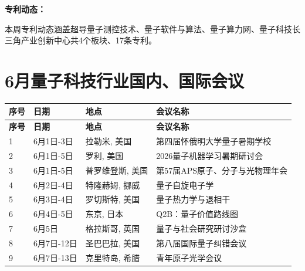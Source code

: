\documentclass[12pt,a4paper]{ctexart}
\begin{document}
\textbf{ 专利动态：}

本周专利动态涵盖超导量子测控技术、量子软件与算法、量子算力网、量子科技长三角产业创新中心共4个板块、17条专利。




{
    \newpage
    \section*{ 6月量子科技行业国内、国际会议}
    \scriptsize
    \begin{longtable}{C{0.8cm}L{2.5cm}L{3cm}L{7cm}}
        \toprule[1.5pt]
        \textbf{序号} & \textbf{日期} & \textbf{地点} & \textbf{会议名称} \\
        \midrule
        \endfirsthead
        \toprule
        \textbf{序号} & \textbf{日期} & \textbf{地点} & \textbf{会议名称} \\
        \midrule
        \endhead
        \bottomrule
        \endfoot
        
        1 & 6月1日-3日 & 拉勒米, 美国 & 第四届怀俄明大学量子暑期学校 \\
        \midrule[0.05pt]
        
        2 & 6月1日-5日 & 罗利, 美国 & 2026量子机器学习暑期研讨会 \\
        \midrule[0.05pt]
        
        3 & 6月1日-5日 & 普罗维登斯, 美国 & 第57届APS原子、分子与光物理年会 \\
        \midrule[0.05pt]
        
        4 & 6月2日-4日 & 特隆赫姆, 挪威 & 量子自旋电子学 \\
        \midrule[0.05pt]
        
        5 & 6月3日-4日 & 罗切斯特, 美国 & 量子热力学与退相干 \\
        \midrule[0.05pt]
        
        6 & 6月4日-5日 & 东京, 日本 & Q2B：量子价值路线图 \\
        \midrule[0.05pt]
        
        7 & 6月5日 & 格拉斯哥, 英国 & 量子与社会研究研讨沙盒 \\
        \midrule[0.05pt]
        
        8 & 6月7日-12日 & 圣巴巴拉, 美国 & 第八届国际量子纠错会议 \\
        \midrule[0.05pt]
        
        9 & 6月7日-13日 & 克里特岛, 希腊 & 青年原子光学会议 \\
        \midrule[0.05pt]
        

\end{longtable}}
\end{document}
